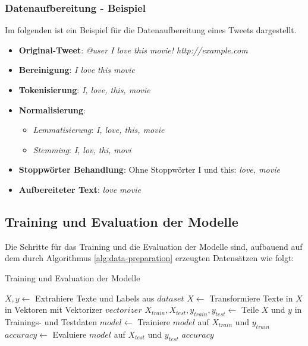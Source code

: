\subsubsection{Datenaufbereitung - Beispiel}

Im folgenden ist ein Beispiel für die Datenaufbereitung eines Tweets dargestellt.
\begin{itemize}
    \item \textbf{Original-Tweet}: \textit{\glqq @user I love this movie! http://example.com\grqq}
    \item \textbf{Bereinigung}: \textit{\glqq I love this movie\grqq}
    \item \textbf{Tokenisierung}: \textit{\glqq I\grqq, \glqq love\grqq, \glqq this\grqq, \glqq movie\grqq}
    \item \textbf{Normalisierung}:
    \begin{itemize}
        \item \textit{Lemmatisierung}: \textit{\glqq I\grqq, \glqq love\grqq, \glqq this\grqq, \glqq movie\grqq}
        \item \textit{Stemming}: \textit{\glqq I\grqq, \glqq lov\grqq, \glqq thi\grqq, \glqq movi\grqq}
    \end{itemize}
    \item \textbf{Stoppwörter Behandlung}: Ohne Stoppwörter \glqq{}I\grqq{} und \glqq{}this\grqq{}: \textit{\glqq love\grqq, \glqq movie\grqq}
    \item \textbf{Aufbereiteter Text}: \textit{\glqq love movie\grqq}
\end{itemize}

\subsection{Training und Evaluation der Modelle}

Die Schritte für das Training und die Evaluation der Modelle sind, aufbauend auf dem durch Algorithmus \ref{alg:data-preparation} erzeugten Datensätzen wie folgt:
\begin{algorithm}
    \caption{Training und Evaluation der Modelle}
    \begin{algorithmic}[1]
            \State $X, y \gets$ Extrahiere Texte und Labels aus $dataset$
            \State $X \gets$ Transformiere Texte in $X$ in Vektoren mit Vektorizer $vectorizer$
            \State $X_{train}, X_{test}, y_{train}, y_{test} \gets$ Teile $X$ und $y$ in Trainings- und Testdaten
            \State $model \gets$ Trainiere $model$ auf $X_{train}$ und $y_{train}$
            \State $accuracy \gets$ Evaluiere $model$ auf $X_{test}$ und $y_{test}$
            \State \Return $accuracy$
        \EndProcedure
    \end{algorithmic}
    \label{alg:model-training}
\end{algorithm}

